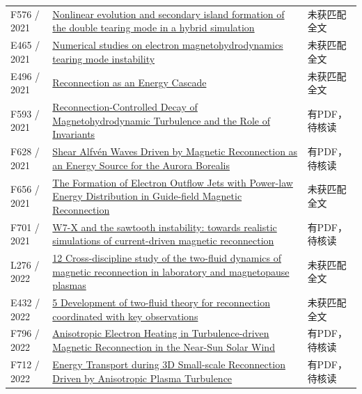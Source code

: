 \begin{longtable}{P{24mm}P{97mm}P{27mm}}
F576 / 2021 & \href{https://doi.org/10.1088/2058-6272/abe038}{Nonlinear evolution and secondary island formation of the double tearing mode in a hybrid simulation} & 未获匹配全文\\

E465 / 2021 & \href{https://doi.org/10.1063/5.0066269}{Numerical studies on electron magnetohydrodynamics tearing mode instability} & 未获匹配全文\\

E496 / 2021 & \href{https://doi.org/10.1002/essoar.10508377.1}{Reconnection as an Energy Cascade} & 未获匹配全文\\

F593 / 2021 & \href{https://doi.org/10.1103/physrevx.11.041005}{Reconnection-Controlled Decay of Magnetohydrodynamic Turbulence and the Role of Invariants} & 有PDF，待核读\\

F628 / 2021 & \href{https://doi.org/10.1029/2021gl094201}{Shear Alfvén Waves Driven by Magnetic Reconnection as an Energy Source for the Aurora Borealis} & 有PDF，待核读\\

F656 / 2021 & \href{https://doi.org/10.3847/1538-4357/abcf29}{The Formation of Electron Outflow Jets with Power-law Energy Distribution in Guide-field Magnetic Reconnection} & 未获匹配全文\\

F701 / 2021 & \href{https://doi.org/10.1088/1741-4326/ac077d}{W7-X and the sawtooth instability: towards realistic simulations of current-driven magnetic reconnection} & 有PDF，待核读\\

L276 / 2022 & \href{https://doi.org/10.2307/j.ctv1w7v22j.15}{12 Cross-discipline study of the two-fluid dynamics of magnetic reconnection in laboratory and magnetopause plasmas} & 未获匹配全文\\

E432 / 2022 & \href{https://doi.org/10.2307/j.ctv1w7v22j.8}{5 Development of two-fluid theory for reconnection coordinated with key observations} & 未获匹配全文\\

F796 / 2022 & \href{https://doi.org/10.3847/1538-4357/ac7da6}{Anisotropic Electron Heating in Turbulence-driven Magnetic Reconnection in the Near-Sun Solar Wind} & 有PDF，待核读\\

F712 / 2022 & \href{https://doi.org/10.3847/1538-4357/ac8667}{Energy Transport during 3D Small-scale Reconnection Driven by Anisotropic Plasma Turbulence} & 有PDF，待核读\\


\end{longtable}
